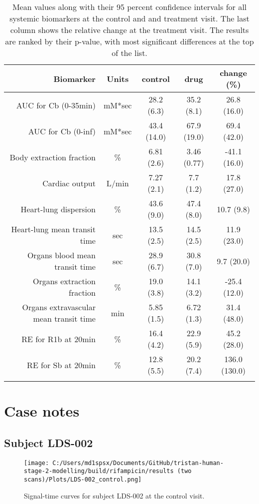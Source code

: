 \documentclass{epflreport}%
\begin{document}
\begin{longtable}{rcccc}%
\hline%
Biomarker&Units&control&drug&change (\%)\\%
\hline%
AUC for Cb (0{-}35min)&mM*sec&28.2 (6.3) &35.2 (8.1) &26.8 (16.0) \\%
AUC for Cb (0{-}inf)&mM*sec&43.4 (14.0) &67.9 (19.0) &69.4 (42.0) \\%
Body extraction fraction&\%&6.81 (2.6) &3.46 (0.77) &{-}41.1 (16.0) \\%
Cardiac output&L/min&7.27 (2.1) &7.7 (1.2) &17.8 (27.0) \\%
Heart{-}lung dispersion&\%&43.6 (9.0) &47.4 (8.0) &10.7 (9.8) \\%
Heart{-}lung mean transit time&sec&13.5 (2.5) &14.5 (2.5) &11.9 (23.0) \\%
Organs blood mean transit time&sec&28.9 (6.7) &30.8 (7.0) &9.7 (20.0) \\%
Organs extraction fraction&\%&19.0 (3.8) &14.1 (3.2) &{-}25.4 (12.0) \\%
Organs extravascular mean transit time&min&5.85 (1.5) &6.72 (1.3) &31.4 (48.0) \\%
RE for R1b at 20min&\%&16.4 (4.2) &22.9 (5.9) &45.2 (28.0) \\%
RE for Sb at 20min&\%&12.8 (5.5) &20.2 (7.4) &136.0 (130.0) \\%
\hline%
\caption{Mean values along with their 95 percent confidence intervals for all systemic biomarkers at the control and and treatment visit. The last column shows the relative change at the treatment visit. The results are ranked by their p-value, with most significant differences at the top of the list.} \\%
\end{longtable}%
\clearpage%
\section{Case notes}%
\label{sec:Casenotes}%

%
\subsection{Subject LDS{-}002}%
\label{subsec:SubjectLDS{-}002}%

%


\begin{figure}[h!]%
\centering%
\texttt{[image: C:/Users/md1spsx/Documents/GitHub/tristan-human-stage-2-modelling/build/rifampicin/results (two scans)/Plots/LDS-002\_control.png]}%
\caption{Signal{-}time curves for subject LDS{-}002 at the control visit.}%
\end{figure}
\end{document}
